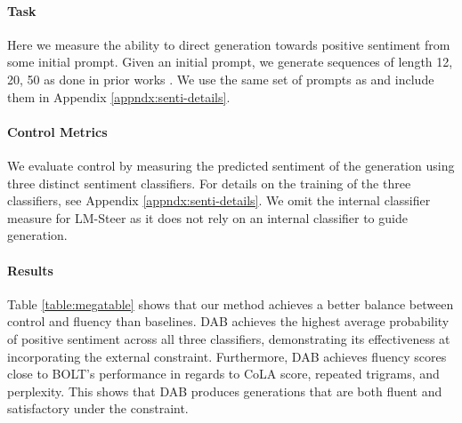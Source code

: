 \paragraph{Task} Here we measure the ability to direct generation towards positive sentiment from some initial prompt. Given an initial prompt, we generate sequences of length 12, 20, 50 as done in prior works \citep{kumar2022gradient, liu2023bolt}. We use the same set of prompts as \citet{dathathri2020plugplaylanguagemodels} and include them in Appendix \ref{appndx:senti-details}.

\paragraph{Control Metrics} We evaluate control by measuring the predicted sentiment of the generation using three distinct sentiment classifiers.
For details on the training of the three classifiers, see Appendix \ref{appndx:senti-details}. 
We omit the internal classifier measure for LM-Steer as it does not rely on an internal classifier to guide generation. 

\paragraph{Results}
Table \ref{table:megatable} shows that our method achieves a better balance between control and fluency than baselines. DAB achieves the highest average probability of positive sentiment across all three classifiers, demonstrating its effectiveness at incorporating the external constraint.  Furthermore, DAB achieves fluency scores close to BOLT's performance in regards to CoLA score, repeated trigrams, and perplexity. This shows that DAB produces generations that are both fluent and satisfactory under the constraint. 